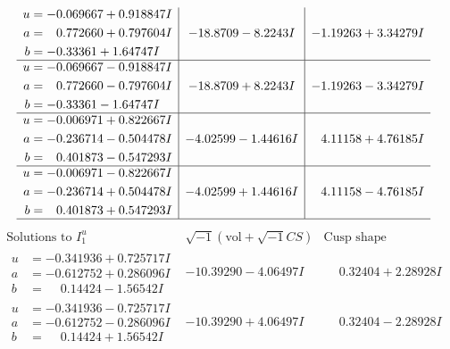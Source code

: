 \documentclass[1p]{elsarticle_modified}
\theoremstyle{definition}
\newcommand{\I}{\sqrt{-1}}
\begin{document}
$$\begin{array}{c|c|c}
\begin{aligned}
u &= -0.069667 + 0.918847 I \\
a &= \phantom{-}0.772660 + 0.797604 I \\
b &= -0.33361 + 1.64747 I\end{aligned}
 & -18.8709 - 8.2243 I & -1.19263 + 3.34279 I \\ \hline\begin{aligned}
u &= -0.069667 - 0.918847 I \\
a &= \phantom{-}0.772660 - 0.797604 I \\
b &= -0.33361 - 1.64747 I\end{aligned}
 & -18.8709 + 8.2243 I & -1.19263 - 3.34279 I \\ \hline\begin{aligned}
u &= -0.006971 + 0.822667 I \\
a &= -0.236714 - 0.504478 I \\
b &= \phantom{-}0.401873 - 0.547293 I\end{aligned}
 & -4.02599 - 1.44616 I & \phantom{-}4.11158 + 4.76185 I \\ \hline\begin{aligned}
u &= -0.006971 - 0.822667 I \\
a &= -0.236714 + 0.504478 I \\
b &= \phantom{-}0.401873 + 0.547293 I\end{aligned}
 & -4.02599 + 1.44616 I & \phantom{-}4.11158 - 4.76185 I\\
 \hline 
 \end{array}$$\newpage$$\begin{array}{c|c|c}  
\text{Solutions to }I^u_{1}& \I (\text{vol} + \sqrt{-1}CS) & \text{Cusp shape}\\
 \hline 
\begin{aligned}
u &= -0.341936 + 0.725717 I \\
a &= -0.612752 + 0.286096 I \\
b &= \phantom{-}0.14424 - 1.56542 I\end{aligned}
 & -10.39290 - 4.06497 I & \phantom{-}0.32404 + 2.28928 I \\ \hline\begin{aligned}
u &= -0.341936 - 0.725717 I \\
a &= -0.612752 - 0.286096 I \\
b &= \phantom{-}0.14424 + 1.56542 I\end{aligned}
 & -10.39290 + 4.06497 I & \phantom{-}0.32404 - 2.28928 I \\ \hline\begin{aligned}

\end{aligned}
\end{array}$$
\end{document}
